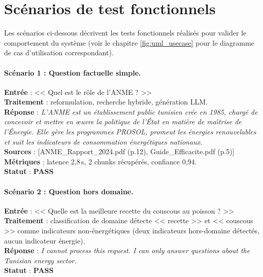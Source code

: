 \documentclass[12pt,a4paper,oneside]{report}
\begin{document}
\section{Sc\'{e}narios de test fonctionnels}

Les sc\'{e}narios ci-dessous d\'{e}crivent les tests fonctionnels r\'{e}alis\'{e}s pour valider le comportement du syst\`{e}me (voir le chapitre \ref{fig:uml_usecase} pour le diagramme de cas d'utilisation correspondant).

\paragraph{Sc\'{e}nario 1 : Question factuelle simple.}
\textbf{Entr\'{e}e} : << Quel est le r\^{o}le de l'ANME ? >> \\
\textbf{Traitement} : reformulation, recherche hybride, g\'{e}n\'{e}ration LLM. \\
\textbf{R\'{e}ponse} : \textit{L'ANME est un \'{e}tablissement public tunisien cr\'{e}e en 1985, charg\'{e} de concevoir et mettre en \oe{}uvre la politique de l'\'{E}tat en mati\`{e}re de ma\^{\i}trise de l'\'{E}nergie. Elle g\`{e}re les programmes PROSOL, promeut les \'{e}nergies renouvelables et suit les indicateurs de consommation \'{e}nerg\'{e}tiques nationaux.} \\
\textbf{Sources} : [ANME\_Rapport\_2024.pdf (p.12), Guide\_Efficacite.pdf (p.5)] \\
\textbf{M\'{e}triques} : latence 2,8\,s, 2 chunks r\'{e}cup\'{e}r\'{e}s, confiance 0,94. \\
\textbf{Statut} : \textcolor{success}{\textbf{PASS}}

\paragraph{Sc\'{e}nario 2 : Question hors domaine.}
\textbf{Entr\'{e}e} : << Quelle est la meilleure recette du couscous au poisson ? >> \\
\textbf{Traitement} : classification de domaine d\'{e}tecte << recette >> et << couscous >> comme indicateurs non-\'{e}nerg\'{e}tiques (deux indicateurs hors-domaine d\'{e}tect\'{e}s, aucun indicateur \'{e}nergie). \\
\textbf{R\'{e}ponse} : \textit{I cannot process this request. I can only answer questions about the Tunisian energy sector.} \\
\textbf{Statut} : \textcolor{success}{\textbf{PASS}}
\end{document}
